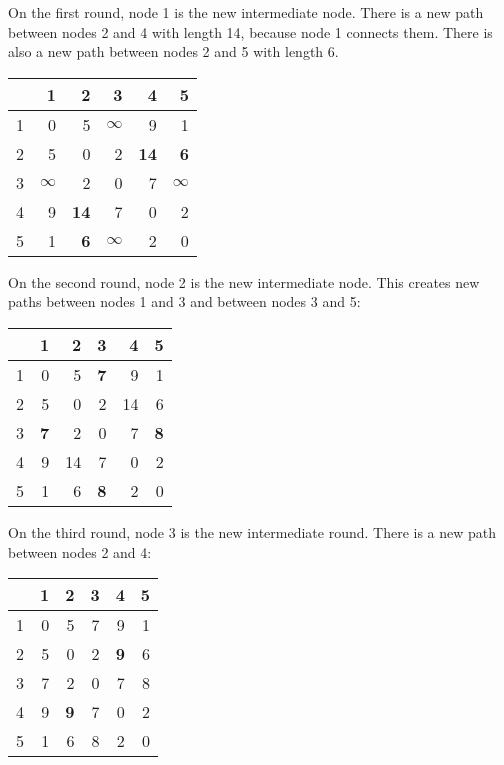 \documentclass[twoside,12pt,a4paper,english]{book}
\theoremstyle{definition}
\theoremstyle{problemstyle}
\begin{document}
On the first round, node 1 is the new intermediate node.
There is a new path between nodes 2 and 4
with length 14, because node 1 connects them.
There is also a new path 
between nodes 2 and 5 with length 6.

\begin{center}
\begin{tabular}{r|rrrrr}
 & 1 & 2 & 3 & 4 & 5 \\
\hline
1 & 0 & 5 & $\infty$ & 9 & 1 \\
2 & 5 & 0 & 2 & \textbf{14} & \textbf{6} \\
3 & $\infty$ & 2 & 0 & 7 & $\infty$ \\
4 & 9 & \textbf{14} & 7 & 0 & 2 \\
5 & 1 & \textbf{6} & $\infty$ & 2 & 0 \\
\end{tabular}
\end{center}
\vspace{10pt}

On the second round, node 2 is the new intermediate node.
This creates new paths between nodes 1 and 3
and between nodes 3 and 5:

\begin{center}
\begin{tabular}{r|rrrrr}
 & 1 & 2 & 3 & 4 & 5 \\
\hline
1 & 0 & 5 & \textbf{7} & 9 & 1 \\
2 & 5 & 0 & 2 & 14 & 6 \\
3 & \textbf{7} & 2 & 0 & 7 & \textbf{8} \\
4 & 9 & 14 & 7 & 0 & 2 \\
5 & 1 & 6 & \textbf{8} & 2 & 0 \\
\end{tabular}
\end{center}
\vspace{10pt}

On the third round, node 3 is the new intermediate round.
There is a new path between nodes 2 and 4:

\begin{center}
\begin{tabular}{r|rrrrr}
 & 1 & 2 & 3 & 4 & 5 \\
\hline
1 & 0 & 5 & 7 & 9 & 1 \\
2 & 5 & 0 & 2 & \textbf{9} & 6 \\
3 & 7 & 2 & 0 & 7 & 8 \\
4 & 9 & \textbf{9} & 7 & 0 & 2 \\
5 & 1 & 6 & 8 & 2 & 0 \\
\end{tabular}
\end{center}
\vspace{10pt}
\end{document}
